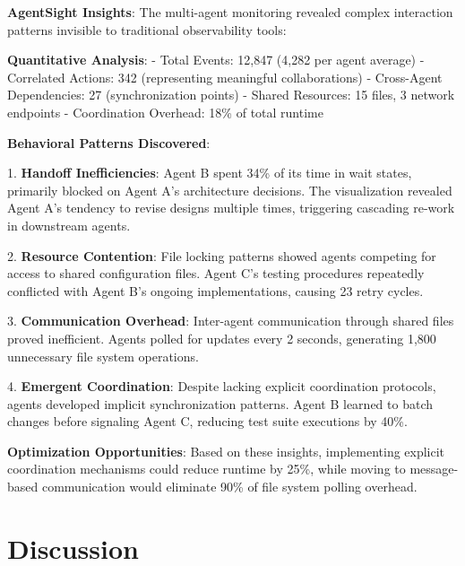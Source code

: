 \documentclass[sigplan,screen，review,9pt]{acmart}
\begin{document}
\textbf{AgentSight Insights}: The multi-agent monitoring revealed complex interaction patterns invisible to traditional observability tools:

\textbf{Quantitative Analysis}:
- Total Events: 12,847 (4,282 per agent average)
- Correlated Actions: 342 (representing meaningful collaborations)
- Cross-Agent Dependencies: 27 (synchronization points)
- Shared Resources: 15 files, 3 network endpoints
- Coordination Overhead: 18\% of total runtime

\textbf{Behavioral Patterns Discovered}:

1. \textbf{Handoff Inefficiencies}: Agent B spent 34\% of its time in wait states, primarily blocked on Agent A's architecture decisions. The visualization revealed Agent A's tendency to revise designs multiple times, triggering cascading re-work in downstream agents.

2. \textbf{Resource Contention}: File locking patterns showed agents competing for access to shared configuration files. Agent C's testing procedures repeatedly conflicted with Agent B's ongoing implementations, causing 23 retry cycles.

3. \textbf{Communication Overhead}: Inter-agent communication through shared files proved inefficient. Agents polled for updates every 2 seconds, generating 1,800 unnecessary file system operations.

4. \textbf{Emergent Coordination}: Despite lacking explicit coordination protocols, agents developed implicit synchronization patterns. Agent B learned to batch changes before signaling Agent C, reducing test suite executions by 40\%.

\textbf{Optimization Opportunities}: Based on these insights, implementing explicit coordination mechanisms could reduce runtime by 25\%, while moving to message-based communication would eliminate 90\% of file system polling overhead.


\section{Discussion}
\end{document}

